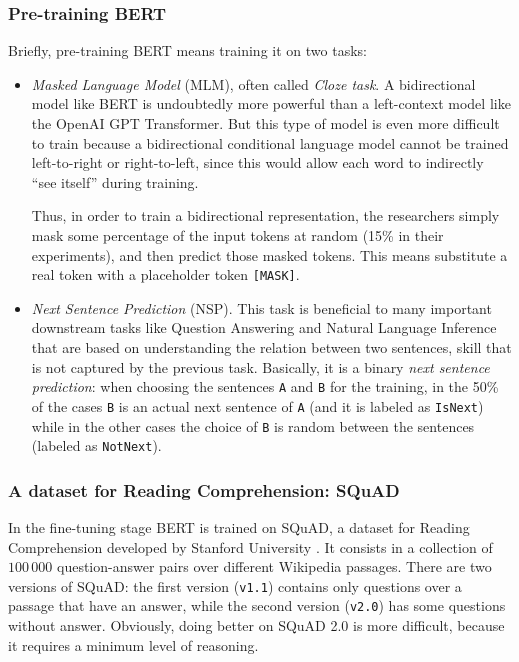 \subsubsection{Pre-training BERT}
Briefly, pre-training BERT means training it on two tasks:
\begin{itemize}
  \item \textit{Masked Language Model} (MLM), often called \textit{Cloze task}. A bidirectional model like BERT is undoubtedly more powerful than a left-context model like the OpenAI GPT Transformer. But this type of model is even more difficult to train because a bidirectional conditional language model cannot be trained left-to-right or right-to-left, since this would allow each word to indirectly “see itself” during training.

  Thus, in order to train a bidirectional representation, the researchers simply mask some percentage of the input tokens at random (15\% in their experiments), and then predict those masked tokens. This means substitute a real token with a placeholder token \texttt{[MASK]}.
  
  \item \textit{Next Sentence Prediction} (NSP). This task is beneficial to many important downstream tasks like Question Answering and Natural Language Inference that are based on understanding the relation between two sentences, skill that is not captured by the previous task. Basically, it is a binary \textit{next sentence prediction}: when choosing the sentences \texttt{A} and \texttt{B} for the training, in the 50\% of the cases \texttt{B} is an actual next sentence of \texttt{A} (and it is labeled as \texttt{IsNext}) while in the other cases the choice of \texttt{B} is random between the sentences (labeled as \texttt{NotNext}).
\end{itemize}

\subsubsection{A dataset for Reading Comprehension: SQuAD}
\label{squad}
In the fine-tuning stage BERT is trained on SQuAD, a dataset for Reading Comprehension developed by Stanford University \cite{squad}. It consists in a collection of $100\,000$ question-answer pairs over different Wikipedia passages. There are two versions of SQuAD: the first version (\texttt{v1.1}) contains only questions over a passage that have an answer, while the second version (\texttt{v2.0}) has some questions without answer. Obviously, doing better on SQuAD 2.0 is more difficult, because it requires a minimum level of reasoning.

